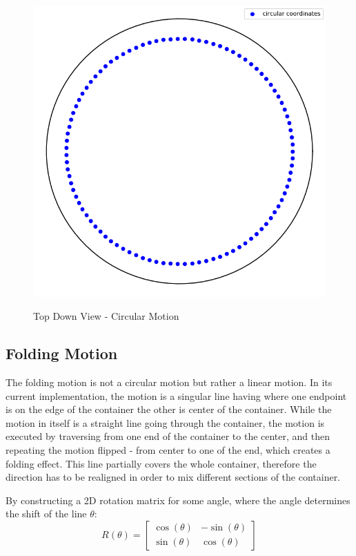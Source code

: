 \begin{figure}[H]
    \includegraphics[scale=0.35]{Graphics/motions/circular_motion.png}
    \centering
    \label{fig:circularMotion}
    \caption{Top Down View - Circular Motion}
\end{figure}

\subsection{Folding Motion}
The folding motion is not a circular motion but rather a linear motion. In its current implementation, the motion is a singular line having where one endpoint is on the edge of the container
the other is center of the container. While the motion in itself is a straight line going through the container, the motion is executed by traversing from one end of the container to the center,
and then repeating the motion flipped - from center to one of the end, which creates a folding effect.
This line partially covers the whole container, therefore the direction has to be realigned in order to mix different sections of the container.

By constructing a 2D rotation matrix for some angle, where the angle determines the shift of the line $\theta$:
\[R(\theta) = \begin{bmatrix}
    \cos(\theta) & -\sin(\theta) \\
    \sin(\theta) & \cos(\theta)
     \end{bmatrix}
 \] 

